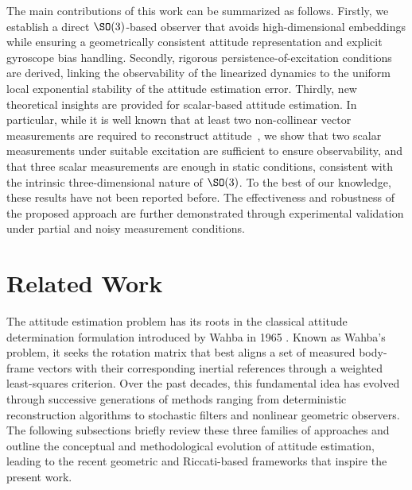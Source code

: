 The main contributions of this work can be summarized as follows. Firstly, we establish a direct $\SO(3)$-based observer that avoids high-dimensional embeddings while ensuring a geometrically consistent attitude representation and explicit gyroscope bias handling. Secondly, rigorous persistence-of-excitation conditions are derived, linking the observability of the linearized dynamics to the uniform local exponential stability of the attitude estimation error. Thirdly, new theoretical insights are provided for scalar-based attitude estimation. In particular, while it is well known that at least two non-collinear vector measurements are required to reconstruct attitude~\cite{Mahony_Hamel_Pflimlin,batista2012sensor}, we show that two scalar measurements under suitable excitation are sufficient to ensure observability, and that three scalar measurements are enough in static conditions, consistent with the intrinsic three-dimensional nature of $\SO(3)$. To the best of our knowledge, these results have not been reported before. The effectiveness and robustness of the proposed approach are further demonstrated through experimental validation under partial and noisy measurement conditions.
\section{Related Work}
The attitude estimation problem has its roots in the classical attitude determination formulation introduced by Wahba in 1965 \cite{wahba1965least}. Known as Wahba’s problem, it seeks the rotation matrix that best aligns a set of measured body-frame vectors with their corresponding inertial references through a weighted least-squares criterion. 
Over the past decades, this fundamental idea has evolved through successive generations of methods ranging from deterministic reconstruction algorithms to stochastic filters and nonlinear geometric observers. The following subsections briefly review these three families of approaches and outline the conceptual and methodological evolution of attitude estimation, leading to the recent geometric and Riccati-based frameworks that inspire the present work.

